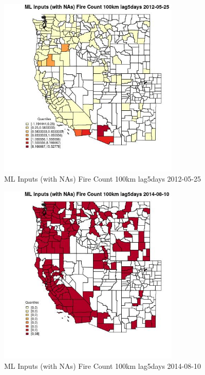 \begin{figure} 
\centering  
\includegraphics[width=0.77\textwidth]{Code_Outputs/Report_ML_input_PM25_Step4_part_e_de_duplicated_aves_compiled_2019-05-18wNAs_CountyFire_Count_100km_lag5daysMean2012-05-25_2012-05-25.jpg} 
\caption{\label{fig:Report_ML_input_PM25_Step4_part_e_de_duplicated_aves_compiled_2019-05-18wNAsCountyFire_Count_100km_lag5daysMean2012-05-25_2012-05-25}ML Inputs (with NAs) Fire Count 100km lag5days 2012-05-25} 
\end{figure} 
 

\begin{figure} 
\centering  
\includegraphics[width=0.77\textwidth]{Code_Outputs/Report_ML_input_PM25_Step4_part_e_de_duplicated_aves_compiled_2019-05-18wNAs_CountyFire_Count_100km_lag5daysMean2014-08-10_2014-08-10.jpg} 
\caption{\label{fig:Report_ML_input_PM25_Step4_part_e_de_duplicated_aves_compiled_2019-05-18wNAsCountyFire_Count_100km_lag5daysMean2014-08-10_2014-08-10}ML Inputs (with NAs) Fire Count 100km lag5days 2014-08-10} 
\end{figure} 
 

